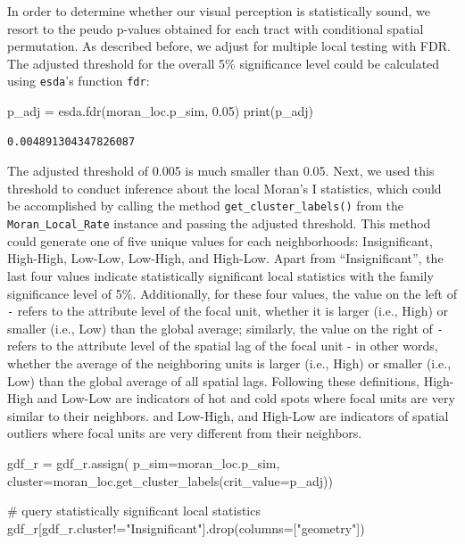 \documentclass[
]{aft}
\newenvironment{Shaded}{\begin{snugshade}}{\end{snugshade}}
\newcommand{\BuiltInTok}[1]{\textcolor[rgb]{0.00,0.23,0.31}{#1}}
\newcommand{\CommentTok}[1]{\textcolor[rgb]{0.37,0.37,0.37}{#1}}
\newcommand{\FloatTok}[1]{\textcolor[rgb]{0.68,0.00,0.00}{#1}}
\newcommand{\NormalTok}[1]{\textcolor[rgb]{0.00,0.23,0.31}{#1}}
\newcommand{\OperatorTok}[1]{\textcolor[rgb]{0.37,0.37,0.37}{#1}}
\newcommand{\StringTok}[1]{\textcolor[rgb]{0.13,0.47,0.30}{#1}}
\begin{document}
In order to determine whether our visual perception is statistically
sound, we resort to the peudo p-values obtained for each tract with
conditional spatial permutation. As described before, we adjust for
multiple local testing with FDR. The adjusted threshold for the overall
5\% significance level could be calculated using \texttt{esda}'s
function \texttt{fdr}:

\begin{Shaded}
\begin{Highlighting}[]
\NormalTok{p\_adj }\OperatorTok{=}\NormalTok{ esda.fdr(moran\_loc.p\_sim, }\FloatTok{0.05}\NormalTok{)}
\BuiltInTok{print}\NormalTok{(p\_adj)}
\end{Highlighting}
\end{Shaded}

\begin{verbatim}
0.004891304347826087
\end{verbatim}

The adjusted threshold of 0.005 is much smaller than 0.05. Next, we used
this threshold to conduct inference about the local Moran's I
statistics, which could be accomplished by calling the method
\texttt{get\_cluster\_labels()} from the \texttt{Moran\_Local\_Rate}
instance and passing the adjusted threshold. This method could generate
one of five unique values for each neighborhoods: Insignificant,
High-High, Low-Low, Low-High, and High-Low. Apart from
``Insignificant'', the last four values indicate statistically
significant local statistics with the family significance level of 5\%.
Additionally, for these four values, the value on the left of \texttt{-}
refers to the attribute level of the focal unit, whether it is larger
(i.e., High) or smaller (i.e., Low) than the global average; similarly,
the value on the right of \texttt{-} refers to the attribute level of
the spatial lag of the focal unit - in other words, whether the average
of the neighboring units is larger (i.e., High) or smaller (i.e., Low)
than the global average of all spatial lags. Following these
definitions, High-High and Low-Low are indicators of hot and cold spots
where focal units are very similar to their neighbors. and Low-High, and
High-Low are indicators of spatial outliers where focal units are very
different from their neighbors.

\begin{Shaded}
\begin{Highlighting}[]
\NormalTok{gdf\_r }\OperatorTok{=}\NormalTok{ gdf\_r.assign(}
\NormalTok{  p\_sim}\OperatorTok{=}\NormalTok{moran\_loc.p\_sim, }
\NormalTok{  cluster}\OperatorTok{=}\NormalTok{moran\_loc.get\_cluster\_labels(crit\_value}\OperatorTok{=}\NormalTok{p\_adj))}

\CommentTok{\# query statistically significant local statistics}
\NormalTok{gdf\_r[gdf\_r.cluster}\OperatorTok{!=}\StringTok{"Insignificant"}\NormalTok{].drop(columns}\OperatorTok{=}\NormalTok{[}\StringTok{"geometry"}\NormalTok{])}
\end{Highlighting}
\end{Shaded}
\end{document}
